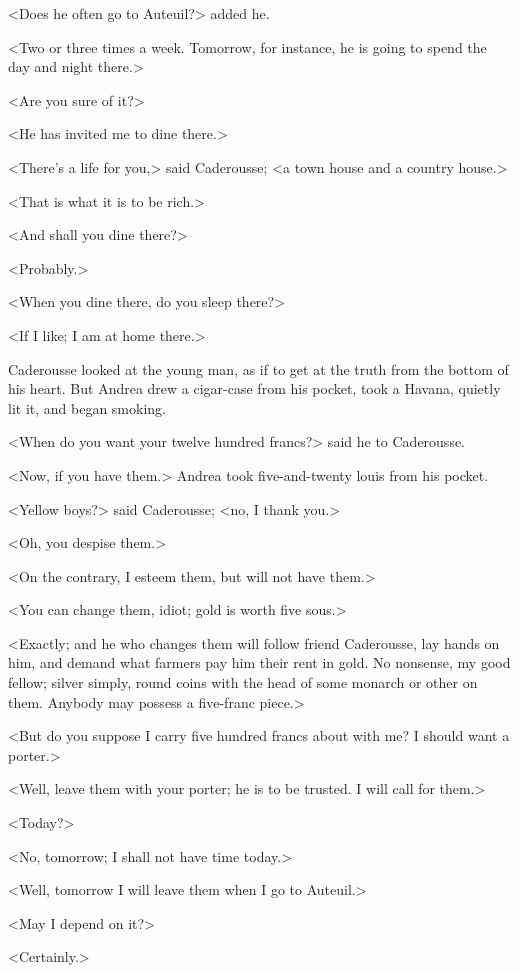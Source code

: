  <Does he often go to Auteuil?> added he. 

 <Two or three times a week. Tomorrow, for instance, he is going to spend the day and night there.> 

 <Are you sure of it?> 

 <He has invited me to dine there.> 

 <There's a life for you,> said Caderousse; <a town house and a country house.> 

 <That is what it is to be rich.> 

 <And shall you dine there?> 

 <Probably.> 

 <When you dine there, do you sleep there?> 

 <If I like; I am at home there.> 

 Caderousse looked at the young man, as if to get at the truth from the bottom of his heart. But Andrea drew a cigar-case from his pocket, took a Havana, quietly lit it, and began smoking. 

 <When do you want your twelve hundred francs?> said he to Caderousse. 

 <Now, if you have them.> Andrea took five-and-twenty louis from his pocket. 

 <Yellow boys?> said Caderousse; <no, I thank you.> 

 <Oh, you despise them.> 

 <On the contrary, I esteem them, but will not have them.> 

 <You can change them, idiot; gold is worth five sous.> 

 <Exactly; and he who changes them will follow friend Caderousse, lay hands on him, and demand what farmers pay him their rent in gold. No nonsense, my good fellow; silver simply, round coins with the head of some monarch or other on them. Anybody may possess a five-franc piece.> 

 <But do you suppose I carry five hundred francs about with me? I should want a porter.> 

 <Well, leave them with your porter; he is to be trusted. I will call for them.> 

 <Today?> 

 <No, tomorrow; I shall not have time today.> 

 <Well, tomorrow I will leave them when I go to Auteuil.> 

 <May I depend on it?> 

 <Certainly.> 

